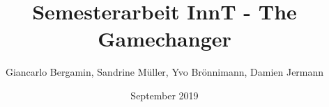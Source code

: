 \documentclass{scrartcl}
\begin{document}
\title{Semesterarbeit InnT - The Gamechanger}
\author{Giancarlo Bergamin, Sandrine Müller, Yvo Brönnimann, Damien Jermann}
\date{September 2019}
\maketitle

\newpage
\tableofcontents

\newpage


\newpage


\newpage


\newpage


\newpage


\newpage


\newpage


\newpage


\newpage


\newpage


\newpage

\end{document}
